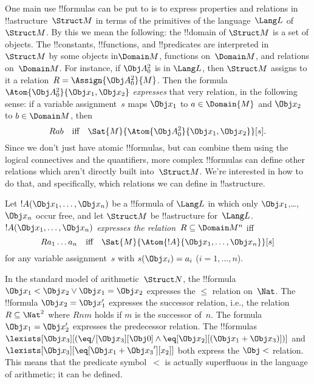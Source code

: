 \documentclass[../../include/open-logic-section]{subfiles}
\begin{document}


\begin{explain}
One main use !!{formula}s can be put to is to express properties and
relations in !!a{structure}~$\Struct M$ in terms of the primitives of
the language~$\Lang L$ of~$\Struct M$.  By this we mean the following:
the !!{domain} of $\Struct M$ is a set of objects.  The !!{constant}s,
!!{function}s, and !!{predicate}s are interpreted in~$\Struct M$ by
some objects in$\Domain M$, functions on~$\Domain M$, and relations
on~$\Domain M$.  For instance, if $\Obj A^2_0$ is in $\Lang L$, then
$\Struct M$ assigns to it a relation~$R = \Assign{{\Obj
  A^2_0}}{M}$. Then the formula $\Atom{\Obj A^2_0}{\Obj x_1, \Obj x_2}$
\emph{expresses} that very relation, in the following sense: if a
variable assignment~$s$ maps $\Obj x_1$ to $a \in \Domain{M}$ and
$\Obj x_2$ to $b \in \Domain M$, then
\[
Rab \text{\quad iff\quad} \Sat{M}{\Atom{\Obj A^2_0}{\Obj x_1, \Obj x_2}}[s].
\]
Since we don't just have atomic !!{formula}s, but can combine them
using the logical connectives and the quantifiers, more complex
!!{formula}s can define other relations which aren't directly built
into~$\Struct M$.  We're interested in how to do that, and
specifically, which relations we can define in !!a{structure}.
\end{explain}

\begin{defn}
Let $!A(\Obj x_1,\dots, \Obj x_n)$ be a !!{formula} of $\Lang L$ in
which only $\Obj x_1$,\dots, $\Obj x_n$ occur free, and let $\Struct
M$ be !!a{structure} for~$\Lang L$. $!A(\Obj x_1,\dots, \Obj x_n)$
\emph{expresses the relation}~$R \subseteq \Domain M^n$ iff
\[
Ra_1\dots a_n \text{\quad iff\quad} \Sat{M}{\Atom{!A}{\Obj
    x_1,\dots, \Obj x_n}}[s]
\]
for any variable assignment~$s$ with $s(\Obj x_i) = a_i$ ($i = 1,
\dots, n$).
\end{defn}

\begin{ex}
In the standard model of arithmetic~$\Struct N$, the !!{formula} $\Obj
x_1 < \Obj x_2 \lor \Obj x_1 = \Obj x_2$ expresses the $\le$ relation
on~$\Nat$. The !!{formula} $\Obj x_2 = \Obj x_1'$ expresses the
successor relation, i.e., the relation $R \subseteq \Nat^2$ where
$Rnm$ holds if $m$ is the successor of~$n$. The formula $\Obj x_1 =
\Obj x_2'$ expresses the predecessor relation.  The !!{formula}s
$\lexists[\Obj x_3][(\eq/[\Obj x_3][\Obj 0] \land \eq[\Obj x_2][(\Obj
    x_1 + \Obj x_3)])]$ and $\lexists[\Obj x_3][\eq[\Obj x_1 + {\Obj
      x_3}'][x_2]]$ both express the $\Obj <$ relation.  This means
that the predicate symbol~$<$ is actually superfluous in the language
of arithmetic; it can be defined.
\end{ex}
\end{document}
